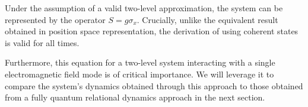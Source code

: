 Under the assumption of a valid two-level approximation, the system can be represented 
by the operator $S = g\sigma_x$.  Crucially, unlike the equivalent result obtained in 
position space representation, the derivation of  using coherent 
states is valid for all times.

Furthermore, this equation for a two-level system interacting with a single electromagnetic 
field mode is of critical importance. We will leverage it to compare the system's dynamics 
obtained through this approach to those obtained from a fully quantum relational dynamics 
approach in the next section.